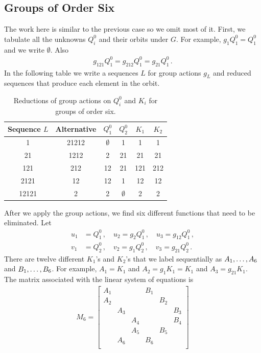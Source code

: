 \subsection{Groups of Order Six}
The work here is similar to the previous case so we omit most of it. First, we tabulate all the unknowns $Q_i^0$ and their orbits under $G$. For example, $g_1Q_1^0 = Q_1^0$ and we write $\emptyset$. Also
\begin{align}
	g_{121}Q_1^0 = g_{212} Q_1^0 = g_{21} Q_1^0\,. 
\end{align}
In the following table we write a sequences $L$ for group actions $g_L$ and reduced sequences that produce each element in the orbit.
\begin{table}[H]
	\caption{Reductions of group actions on $Q_i^0$ and $K_i$ for groups of order six.}
	\label{tbl:tableG6}
	\centering
	\begin{tabular}{cccccc}
		\toprule
		Sequence $L$ & Alternative & $Q_1^0$ & $Q_2^0$ & $K_1$ & $K_2$ \\ 
		\midrule
		1 & 21212 & $\emptyset$ & 1& 1& 1 \\
		21 &  1212& 2& 21 & 21& 21  \\
		121 & 212 & 12& 21& 121& 212 \\
		2121 & 12 &  12 & 1 & 12 & 12 \\
		12121 & 2 &  2& $\emptyset$& 2& 2 \\
		\bottomrule
	\end{tabular}
\end{table}
After we apply the group actions, we find six different functions that need to be eliminated.  Let
\begin{align}
	u_1 &= Q_1^0\,,\quad u_2 = g_2 Q_1^0\,,\quad u_3 = g_{12}Q_1^0\,,\\
	v_1 &= Q_2^0\,,\quad v_2 = g_1 Q_2^0\,,\quad v_3 = g_{21}Q_2^0\,.
\end{align}
There are twelve different $K_1$'s and $K_2$'s that we label sequentially as $A_1,\ldots, A_6$ and $B_1,\ldots, B_6$. For example, $A_1 = K_1$ and $A_2 = g_1 K_1 = K_1$ and $A_3 = g_{21} K_1$. The matrix associated with the linear system of equations is
\begin{align}
	M_6 = \begin{bmatrix}
		A_1& & & B_1 & & \\
		A_2& & & & B_2& \\
		& A_3& & & & B_3\\
		& & A_4 & & & B_4\\
		& & A_5& & B_5& \\
		&A_6 & &B_6 & & \\
	\end{bmatrix}
\end{align}
